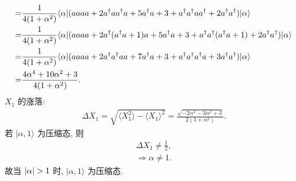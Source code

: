 \documentclass{assignment}
\begin{document}
\begin{pf}
\begin{align}
        \notag=&\frac{1}{4(1+\alpha^2)}\langle\alpha\rvert(aaaa+2a^{\dagger}aa^{\dagger}a+5a^{\dagger}a+3+a^{\dagger}a^{\dagger}aa^{\dagger}+2a^{\dagger}a^{\dagger})\lvert\alpha\rangle\\
        \notag=&\frac{1}{4(1+\alpha^2)}\langle\alpha\rvert(aaaa+2a^{\dagger}(a^{\dagger}a+1)a+5a^{\dagger}a+3+a^{\dagger}a^{\dagger}(a^{\dagger}a+1)+2a^{\dagger}a^{\dagger})\lvert\alpha\rangle\\
        \notag=&\frac{1}{4(1+\alpha^2)}\langle\alpha\rvert(aaaa+2a^{\dagger}a^{\dagger}aa+7a^{\dagger}a+3+a^{\dagger}a^{\dagger}a^{\dagger}a+3a^{\dagger}a^{\dagger})\lvert\alpha\rangle\\
        =&\frac{4\alpha^4+10\alpha^2+3}{4(1+\alpha^2)}.
    \end{align}
    $X_1$ 的涨落:
    \begin{align}
        \Delta X_1=\sqrt{\langle X_1^2\rangle-\langle X_1\rangle^2}=\frac{\sqrt{-2\alpha^4-3\alpha^2+3}}{2(1+\alpha^2)}.
    \end{align}
    若 $\lvert\alpha,1\rangle$ 为压缩态, 则
    \begin{gather}
        \Delta X_1\neq\frac{1}{2},\\
        \Longrightarrow\alpha\neq 1.
    \end{gather}
    故当 $\left\lvert\alpha\right\rvert>1$ 时, $\lvert\alpha,1\rangle$ 为压缩态.
\end{pf}
\end{document}
